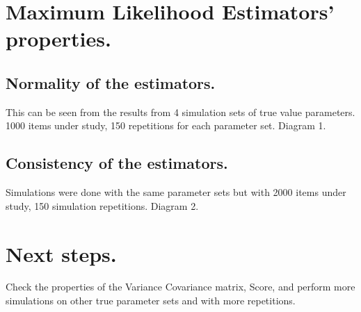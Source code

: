 \documentclass{article}
\begin{document}
\section{Maximum Likelihood Estimators' properties.}
\subsection{Normality of the estimators.} This can be seen from the results from 4 simulation sets of true value parameters. 1000 items under study, 150 repetitions for each parameter set. Diagram 1.  \\
\subsection{Consistency of the estimators.} Simulations were done with the same parameter sets but with 2000 items under study, 150 simulation repetitions. Diagram 2.\\
\section{Next steps.}
Check the properties of the Variance Covariance matrix, Score, and perform more simulations on other true parameter sets and with more repetitions.
\end{document}
